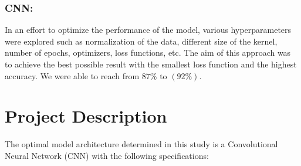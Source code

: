 \documentclass{article}
\begin{document}
\subsubsection{CNN:}
In an effort to optimize the performance of the model, various hyperparameters were explored such as normalization of the data, different size of the kernel, number of epochs, optimizers, loss functions, etc.
The aim of this approach was to achieve the best possible result with the smallest loss function and the highest accuracy. We were able to reach from ${87\%}$ to $(92\%)$.\\

\newpage
\section{Project Description}

The optimal model architecture determined in this study is a Convolutional Neural Network (CNN) with the following specifications:
\end{document}
